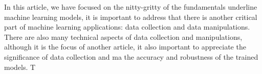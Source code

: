 In this article, we have focused on the nitty-gritty of the fundamentals underline machine learning models, it is important to address that there is another critical part of machine learning applications: data collection and data manipulations. There are also many technical aspects of data collection and manipulations, although it is the focus of another article, it also important to appreciate the significance of data collection and ma the accuracy and robustness of the trained models. T